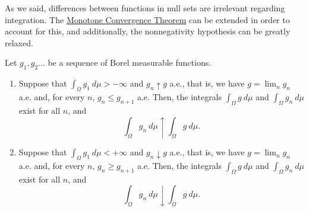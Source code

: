 As we said, differences between functions in null sets are irrelevant regarding integration. The \hyperref[theorem:Monotone Convergence]{Monotone Convergence Theorem} can be extended in order to account for this, and additionally, the nonnegativity hypothesis can be greatly relaxed.

\begin{thrm}\label{theorem:Extended
Monotone Convergence} Let \(g_1,g_2\dots\) be a sequence of Borel measurable
functions.
	\begin{enumerate}
		\item Suppose that \(\int_{\Omega}g_1~d\mu>-\infty\) and
\(g_n\uparrow g\) a.e., that is, we have \(g=\lim_{n}g_{n}\) a.e. and, for every
\(n\), \(g_{n}\leq g_{n+1}\) a.e. Then, the integrals \(\int_{\Omega}g~d\mu\)
and \(\int_{\Omega}g_n~d\mu\) exist for all \(n\), and
		\[\int_{\Omega}g_n~d\mu\uparrow\int_{\Omega}g~d\mu.\]
		\item Suppose that \(\int_{\Omega}g_1~d\mu<+\infty\) and
\(g_n\downarrow g\) a.e., that is, we have \(g=\lim_{n}g_{n}\) a.e. and, for
every \(n\), \(g_{n}\geq g_{n+1}\) a.e. Then, the integrals
\(\int_{\Omega}g~d\mu\) and \(\int_{\Omega}g_n~d\mu\) exist for all \(n\), and
		\[\int_{\Omega}g_n~d\mu\downarrow\int_{\Omega}g~d\mu.\]
	\end{enumerate}
\end{thrm}
